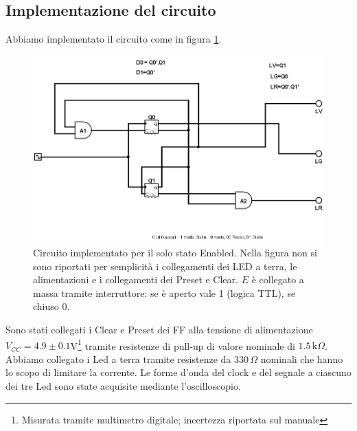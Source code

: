 \documentclass[10pt,a4paper]{article}
\begin{document}
\subsection{Implementazione del circuito}
Abbiamo implementato il circuito come in figura \ref{fig:circenable}.
\begin{figure}[!htb]
\centering
\includegraphics[scale=0.5]{circenable.png}
\caption{Circuito implementato per il solo stato Enabled. Nella figura non si sono riportati per semplicità i collegamenti dei LED a terra, le alimentazioni e i collegamenti dei Preset e Clear. $E$ è collegato a massa tramite interruttore: se è aperto vale 1 (logica TTL), se chiuso 0.\label{fig:circenable}}
\end{figure}
Sono stati collegati i Clear e Preset dei FF alla tensione di alimentazione $V_{CC} = 4.9\pm0.1 $V\footnote{Misurata tramite multimetro digitale; incertezza riportata sul manuale} tramite resistenze di pull-up di valore nominale di $1.5\,\mbox{k}\Omega$. Abbiamo collegato i Led a terra tramite resistenze da $330\,\Omega$ nominali che hanno lo scopo di limitare la corrente.
Le forme d'onda del clock e del segnale a ciascuno dei tre Led sono state acquisite mediante l'oscilloscopio.
\end{document}
